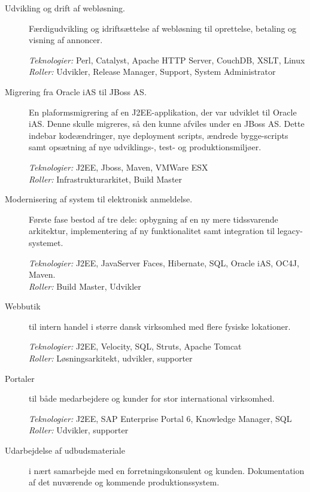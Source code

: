 \documentclass[a4paper,11pt]{article}
\begin{document}
\begin{description}

\item[Udvikling og drift af webløsning.] Færdigudvikling og
  idriftsættelse af webløsning til oprettelse,
  betaling og visning af annoncer.

  \textit{Teknologier:} Perl, Catalyst, Apache HTTP Server, CouchDB, XSLT, Linux\\
  \textit{Roller:} Udvikler, Release Manager, Support, System Administrator

\item[Migrering fra Oracle iAS til JBoss AS.] En
  plaformsmigrering af en J2EE-applikation, der var udviklet til
  Oracle iAS. Denne skulle migreres, så den kunne afviles under
  en JBoss AS. Dette indebar kodeændringer, nye deployment
  scripts, ændrede bygge-scripts samt opsætning af nye
  udviklings-, test- og produktionsmiljøer.

  \textit{Teknologier:} J2EE, Jboss, Maven, VMWare ESX\\
  \textit{Roller:} Infrastrukturarkitet, Build Master

\item[Modernisering af system til elektronisk anmeldelse.]
  Første fase bestod af tre dele: opbygning af en ny mere
  tidssvarende arkitektur, implementering af ny
  funktionalitet samt integration til legacy-systemet.

  \textit{Teknologier:} J2EE, JavaServer Faces, Hibernate, SQL, Oracle
  iAS, OC4J, Maven.\\
  \textit{Roller:} Build Master, Udvikler

\item[Webbutik] til intern handel i større dansk virksomhed
  med flere fysiske lokationer.

  \textit{Teknologier:} J2EE, Velocity, SQL, Struts, Apache Tomcat\\
  \textit{Roller:} Løsningsarkitekt, udvikler, supporter

\item[Portaler] til både medarbejdere og kunder for stor
  international virksomhed.

  \textit{Teknologier:} J2EE, SAP Enterprise Portal 6, Knowledge Manager, SQL\\
  \textit{Roller:} Udvikler, supporter

\item[Udarbejdelse af udbudsmateriale] i nært samarbejde med en
  forretningskonsulent og kunden. Dokumentation af det nuværende og
  kommende produktionssystem.


\end{description}
\end{document}
